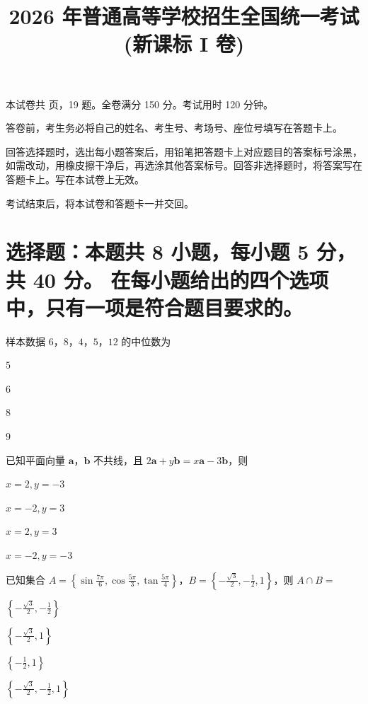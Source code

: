 \documentclass{exam-zh}
\title{2026 年普通高等学校招生全国统一考试 (新课标 I 卷)}
\begin{document}
\secret
\maketitle

\begin{center}
    本试卷共 \pageref{LastPage} 页，19 题。全卷满分 150 分。考试用时 120 分钟。
\end{center}

\begin{notice}
  \item 答卷前，考生务必将自己的姓名、考生号、考场号、座位号填写在答题卡上。
  \item 回答选择题时，选出每小题答案后，用铅笔把答题卡上对应题目的答案标号涂黑，如需改动，用橡皮擦干净后，再选涂其他答案标号。回答非选择题时，将答案写在答题卡上。写在本试卷上无效。
  \item 考试结束后，将本试卷和答题卡一并交回。
\end{notice}

\section{选择题：本题共 8 小题，每小题 5 分，共 40 分。
在每小题给出的四个选项中，只有一项是符合题目要求的。}

\begin{question}
  样本数据 $6$，$8$，$4$，$5$，$12$ 的中位数为 \paren
  \begin{choices}
    \item $5$
    \item $6$
    \item $8$
    \item $9$
  \end{choices}
\end{question}

\begin{question}
  已知平面向量 $\boldsymbol{a}$，$\boldsymbol{b}$ 不共线，且 $2\boldsymbol{a} + y\boldsymbol{b} = x\boldsymbol{a} - 3\boldsymbol{b}$，则 \paren
  \begin{choices}
    \item $x = 2, y = -3$
    \item $x = -2, y = 3$
    \item $x = 2, y = 3$
    \item $x = -2, y = -3$
  \end{choices}
\end{question}

\begin{question}
  已知集合 $A = \left\{\sin\frac{7\pi}{6}, \cos\frac{5\pi}{3}, \tan\frac{5\pi}{4}\right\}$，$B = \left\{-\frac{\sqrt{3}}{2}, -\frac{1}{2}, 1\right\}$，则 $A \cap B =$ \paren
  \begin{choices}
    \item $\left\{-\frac{\sqrt{3}}{2}, -\frac{1}{2}\right\}$
    \item $\left\{-\frac{\sqrt{3}}{2}, 1\right\}$
    \item $\left\{-\frac{1}{2}, 1\right\}$
    \item $\left\{-\frac{\sqrt{3}}{2}, -\frac{1}{2}, 1\right\}$
  \end{choices}
\end{question}
\end{document}
